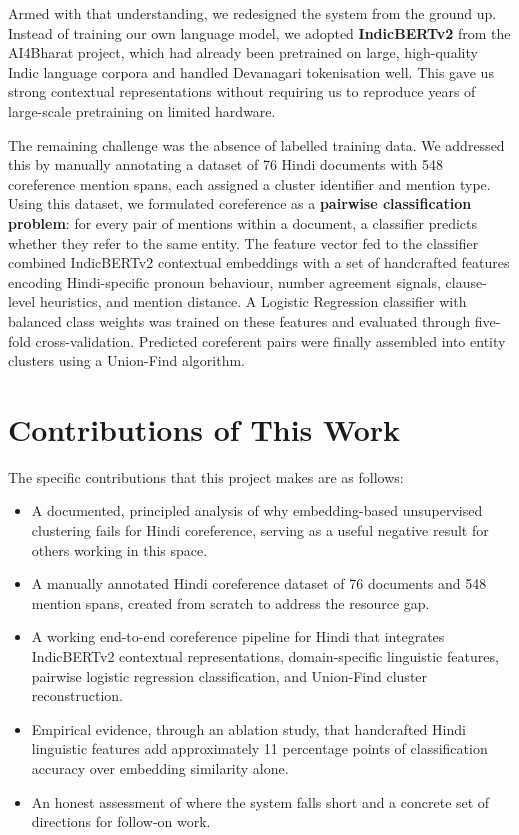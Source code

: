 \documentclass[12pt,a4paper]{report}
\begin{document}
Armed with that understanding, we redesigned the system from the ground up. Instead of training our own language model, we adopted \textbf{IndicBERTv2} from the AI4Bharat project, which had already been pretrained on large, high-quality Indic language corpora and handled Devanagari tokenisation well. This gave us strong contextual representations without requiring us to reproduce years of large-scale pretraining on limited hardware.

The remaining challenge was the absence of labelled training data. We addressed this by manually annotating a dataset of 76 Hindi documents with 548 coreference mention spans, each assigned a cluster identifier and mention type. Using this dataset, we formulated coreference as a \textbf{pairwise classification problem}: for every pair of mentions within a document, a classifier predicts whether they refer to the same entity. The feature vector fed to the classifier combined IndicBERTv2 contextual embeddings with a set of handcrafted features encoding Hindi-specific pronoun behaviour, number agreement signals, clause-level heuristics, and mention distance. A Logistic Regression classifier with balanced class weights was trained on these features and evaluated through five-fold cross-validation. Predicted coreferent pairs were finally assembled into entity clusters using a Union-Find algorithm.

\section{Contributions of This Work}

The specific contributions that this project makes are as follows:

\begin{itemize}
    \item A documented, principled analysis of why embedding-based unsupervised clustering fails for Hindi coreference, serving as a useful negative result for others working in this space.
    \item A manually annotated Hindi coreference dataset of 76 documents and 548 mention spans, created from scratch to address the resource gap.
    \item A working end-to-end coreference pipeline for Hindi that integrates IndicBERTv2 contextual representations, domain-specific linguistic features, pairwise logistic regression classification, and Union-Find cluster reconstruction.
    \item Empirical evidence, through an ablation study, that handcrafted Hindi linguistic features add approximately 11 percentage points of classification accuracy over embedding similarity alone.
    \item An honest assessment of where the system falls short and a concrete set of directions for follow-on work.
\end{itemize}
\end{document}
